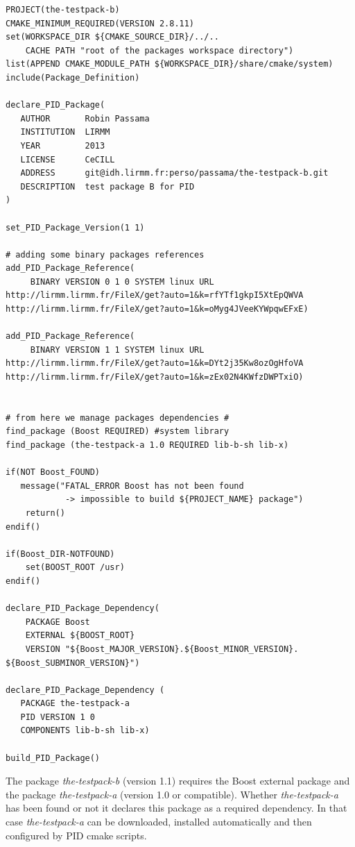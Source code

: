 \documentclass[12pt,a4paper]{article}
\begin{document}
\begin{verbatim}
PROJECT(the-testpack-b)
CMAKE_MINIMUM_REQUIRED(VERSION 2.8.11)
set(WORKSPACE_DIR ${CMAKE_SOURCE_DIR}/../.. 
	CACHE PATH "root of the packages workspace directory")
list(APPEND CMAKE_MODULE_PATH ${WORKSPACE_DIR}/share/cmake/system)
include(Package_Definition)

declare_PID_Package(	
   AUTHOR       Robin Passama 
   INSTITUTION  LIRMM 
   YEAR         2013 
   LICENSE      CeCILL
   ADDRESS      git@idh.lirmm.fr:perso/passama/the-testpack-b.git
   DESCRIPTION  test package B for PID
)

set_PID_Package_Version(1 1)

# adding some binary packages references
add_PID_Package_Reference(	
     BINARY VERSION 0 1 0 SYSTEM linux URL 	
http://lirmm.lirmm.fr/FileX/get?auto=1&k=rfYTf1gkpI5XtEpQWVA
http://lirmm.lirmm.fr/FileX/get?auto=1&k=oMyg4JVeeKYWpqwEFxE)

add_PID_Package_Reference(
     BINARY VERSION 1 1 SYSTEM linux URL 	
http://lirmm.lirmm.fr/FileX/get?auto=1&k=DYt2j35Kw8ozOgHfoVA
http://lirmm.lirmm.fr/FileX/get?auto=1&k=zEx02N4KWfzDWPTxiO)


# from here we manage packages dependencies #
find_package (Boost REQUIRED) #system library
find_package (the-testpack-a 1.0 REQUIRED lib-b-sh lib-x)

if(NOT Boost_FOUND)
   message("FATAL_ERROR Boost has not been found 
            -> impossible to build ${PROJECT_NAME} package")
	return()
endif()

if(Boost_DIR-NOTFOUND)
	set(BOOST_ROOT /usr)
endif()

declare_PID_Package_Dependency(
    PACKAGE Boost 
    EXTERNAL ${BOOST_ROOT} 
    VERSION "${Boost_MAJOR_VERSION}.${Boost_MINOR_VERSION}.
${Boost_SUBMINOR_VERSION}")

declare_PID_Package_Dependency (
   PACKAGE the-testpack-a
   PID VERSION 1 0 
   COMPONENTS lib-b-sh lib-x)

build_PID_Package()

\end{verbatim}

The package \textit{the-testpack-b} (version 1.1) requires the Boost external package and the package \textit{the-testpack-a} (version 1.0 or compatible). Whether \textit{the-testpack-a} has been found or not it declares this package as a required dependency. In that case \textit{the-testpack-a} can be downloaded, installed automatically and then configured by PID cmake scripts.
\end{document}
